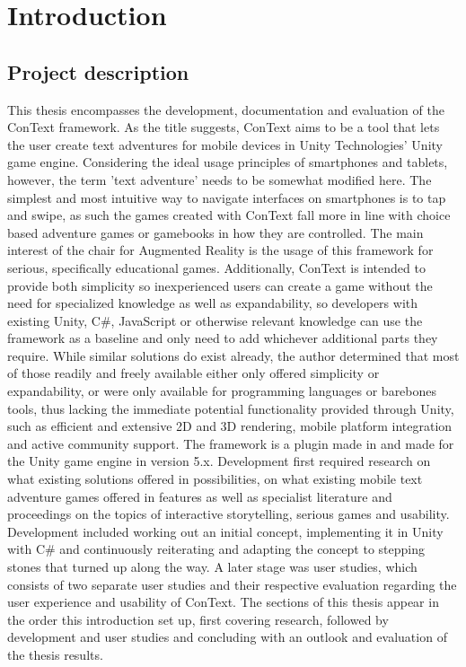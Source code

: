 
\chapter{Introduction}\label{chapter:introduction}

\section{Project description}
This thesis encompasses the development, documentation and evaluation of the ConText framework. As the title suggests, ConText aims to be a tool that lets the user create text adventures for mobile devices in Unity Technologies' Unity game engine\cite{UNITY}. Considering the ideal usage principles of smartphones and tablets, however, the term 'text adventure' needs to be somewhat modified here. The simplest and most intuitive way to navigate interfaces on smartphones is to tap and swipe, as such the games created with ConText fall more in line with choice based adventure games or gamebooks in how they are controlled. The main interest of the chair for Augmented Reality is the usage of this framework for serious, specifically educational games. Additionally, ConText is intended to provide both simplicity so inexperienced users can create a game without the need for specialized knowledge as well as expandability, so developers with existing Unity, C\#, JavaScript or otherwise relevant knowledge can use the framework as a baseline and only need to add whichever additional parts they require. 
While similar solutions do exist already, the author determined that most of those readily and freely available either only offered simplicity or expandability, or were only available for programming languages or barebones tools, thus lacking the immediate potential functionality provided through Unity, such as efficient and extensive 2D and 3D rendering, mobile platform integration and active community support. 
The framework is a plugin made in and made for the Unity game engine in version 5.x. Development first required research on what existing solutions offered in possibilities, on what existing mobile text adventure games offered in features as well as specialist literature and proceedings on the topics of interactive storytelling, serious games and usability. Development included working out an initial concept, implementing it in Unity with C\# and continuously reiterating and adapting the concept to stepping stones that turned up along the way. 
A later stage was user studies, which consists of two separate user studies and their respective evaluation regarding the user experience and usability of ConText.
The sections of this thesis appear in the order this introduction set up, first covering research, followed by development and user studies and concluding with an outlook and evaluation of the thesis results.

